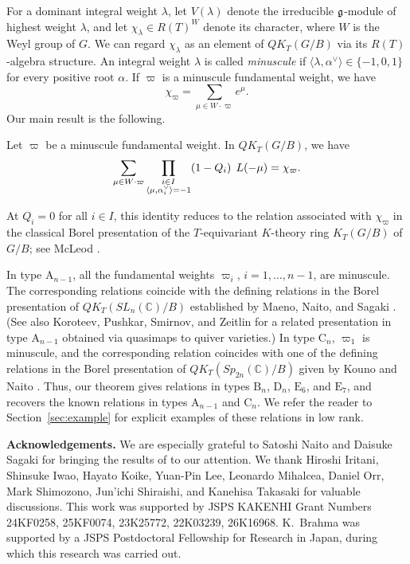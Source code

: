 \documentclass{amsart}
\numberwithin{equation}{section}
\begin{document}
For a dominant integral weight \(\lambda\), let \(V(\lambda)\)
denote the irreducible \(\mathfrak{g}\)-module of highest weight \(\lambda\),
and let \(\chi_\lambda\in R(T)^W\) denote its character,
where \(W\) is the Weyl group of \(G\).
We can regard \(\chi_\lambda\) as an element of \(QK_T(G/B)\)
via its \(R(T)\)-algebra structure.
An integral weight $\lambda$ is called \emph{minuscule} if
  $\langle \lambda,\alpha^\vee\rangle \in \{-1,0,1\}$
  for every positive root $\alpha$. 
If $\varpi$ is a minuscule fundamental weight, 
we have
$$
\chi_{\varpi}=\sum_{\mu\in W\cdot \varpi}
e^\mu.
$$
Our main result is the following.

\begin{thm}\label{thm:main}
Let \(\varpi\) be a minuscule fundamental weight. In \(QK_T(G/B)\), we have
\begin{equation}
    \label{eq:main}
    \sum_{\mu\in W\cdot\varpi}
    \prod_{\substack{i\in I\\
        \langle\mu,\alpha_i^\lor\rangle={-}1}}
        (1-Q_i)
\;\,    {L}(-\mu)
    =
    \chi_\varpi .
\end{equation}
\end{thm}
At \(Q_i=0\) for all \(i\in I\), this identity reduces to
the relation associated with \(\chi_\varpi\) in the classical
Borel presentation of the $T$-equivariant $K$-theory ring \(K_T(G/B)\) of $G/B$; see McLeod \cite{Mc}.

In type \(\mathrm A_{n-1}\), all the fundamental weights
\(\varpi_i\), \(i=1,\ldots,n-1\), are minuscule. 
The corresponding relations coincide with the defining relations
in the Borel presentation of \(QK_T(SL_n(\mathbb C)/B)\)
established by Maeno, Naito, and Sagaki \cite{MNS1}. (See also Koroteev, Pushkar, Smirnov, and Zeitlin \cite{KPSZ}
for a related presentation in type \({\mathrm A}_{n-1}\)
obtained via quasimaps to quiver varieties.)
In type \(\mathrm C_n\), $\varpi_1$ is minuscule,  and 
the corresponding relation
coincides with one of the defining
relations in the Borel presentation of
\(QK_T(Sp_{2n}(\mathbb C)/B)\) given by Kouno and Naito \cite{KN}. Thus, our theorem gives relations in types \(\mathrm B_n\),
\(\mathrm D_n\), \(\mathrm E_6\), and \(\mathrm E_7\), and recovers
the known relations in types \(\mathrm A_{n-1}\) and \(\mathrm C_n\). We refer the reader to Section~\ref{sec:example}
for explicit examples of these relations in low rank.


\medskip

\noindent\textbf{Acknowledgements.}
We are especially grateful to Satoshi Naito and Daisuke Sagaki for bringing the results
of \cite{NS} to our attention.
We thank 
Hiroshi Iritani, Shinsuke Iwao, Hayato Koike, Yuan-Pin Lee,
Leonardo Mihalcea, Daniel Orr, Mark Shimozono,
Jun'ichi Shiraishi, and Kanehisa Takasaki for valuable discussions. This work was supported by JSPS KAKENHI Grant Numbers
24KF0258, 25KF0074, 
23K25772, 22K03239, 
26K16968. 
K.~Brahma was supported by a JSPS Postdoctoral Fellowship for Research in Japan, during which this research was carried out.
\end{document}
